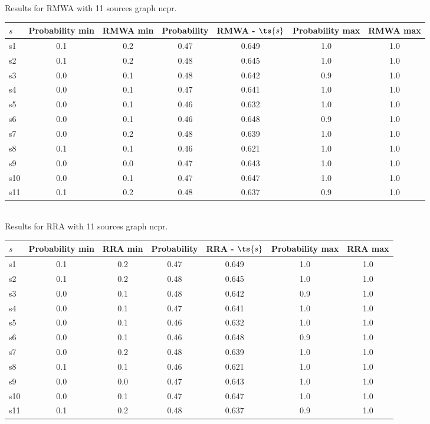 \documentclass{article}
\begin{document}
\noindent Results for RMWA with 11 sources graph ncpr.

\noindent\begin{tabular}{|l|c|c|c|c|c|c|}
\hline
$s$& Probability min & RMWA min & Probability & RMWA - $\ts{s}$ & Probability max & RMWA max\\
\hline
s1 &0.1 & 0.2 & 0.47 & 0.649 & 1.0 & 1.0\\
\hline
s2 &0.1 & 0.2 & 0.48 & 0.645 & 1.0 & 1.0\\
\hline
s3 &0.0 & 0.1 & 0.48 & 0.642 & 0.9 & 1.0\\
\hline
s4 &0.0 & 0.1 & 0.47 & 0.641 & 1.0 & 1.0\\
\hline
s5 &0.0 & 0.1 & 0.46 & 0.632 & 1.0 & 1.0\\
\hline
s6 &0.0 & 0.1 & 0.46 & 0.648 & 0.9 & 1.0\\
\hline
s7 &0.0 & 0.2 & 0.48 & 0.639 & 1.0 & 1.0\\
\hline
s8 &0.1 & 0.1 & 0.46 & 0.621 & 1.0 & 1.0\\
\hline
s9 &0.0 & 0.0 & 0.47 & 0.643 & 1.0 & 1.0\\
\hline
s10 &0.0 & 0.1 & 0.47 & 0.647 & 1.0 & 1.0\\
\hline
s11 &0.1 & 0.2 & 0.48 & 0.637 & 0.9 & 1.0\\
\hline
\end{tabular}\\

\noindent Results for RRA with 11 sources graph ncpr.

\noindent\begin{tabular}{|l|c|c|c|c|c|c|}
\hline
$s$& Probability min & RRA min & Probability & RRA - $\ts{s}$ & Probability max & RRA max\\
\hline
s1 &0.1 & 0.2 & 0.47 & 0.649 & 1.0 & 1.0\\
\hline
s2 &0.1 & 0.2 & 0.48 & 0.645 & 1.0 & 1.0\\
\hline
s3 &0.0 & 0.1 & 0.48 & 0.642 & 0.9 & 1.0\\
\hline
s4 &0.0 & 0.1 & 0.47 & 0.641 & 1.0 & 1.0\\
\hline
s5 &0.0 & 0.1 & 0.46 & 0.632 & 1.0 & 1.0\\
\hline
s6 &0.0 & 0.1 & 0.46 & 0.648 & 0.9 & 1.0\\
\hline
s7 &0.0 & 0.2 & 0.48 & 0.639 & 1.0 & 1.0\\
\hline
s8 &0.1 & 0.1 & 0.46 & 0.621 & 1.0 & 1.0\\
\hline
s9 &0.0 & 0.0 & 0.47 & 0.643 & 1.0 & 1.0\\
\hline
s10 &0.0 & 0.1 & 0.47 & 0.647 & 1.0 & 1.0\\
\hline
s11 &0.1 & 0.2 & 0.48 & 0.637 & 0.9 & 1.0\\
\hline
\end{tabular}\\
\end{document}
